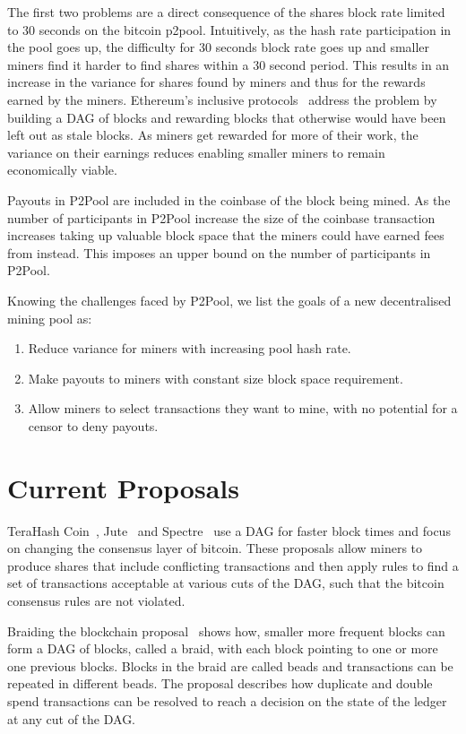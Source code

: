 \documentclass{article}
\begin{document}
The first two problems are a direct consequence of the shares block
rate limited to 30 seconds on the bitcoin p2pool. Intuitively, as the
hash rate participation in the pool goes up, the difficulty for 30
seconds block rate goes up and smaller miners find it harder to find
shares within a 30 second period. This results in an increase in the
variance for shares found by miners and thus for the rewards earned by
the miners. Ethereum's inclusive protocols~\cite{inclusive-protocols}
address the problem by building a DAG of blocks and rewarding blocks
that otherwise would have been left out as stale blocks. As miners get
rewarded for more of their work, the variance on their earnings
reduces enabling smaller miners to remain economically viable.

Payouts in P2Pool are included in the coinbase of the block being
mined. As the number of participants in P2Pool increase the size of
the coinbase transaction increases taking up valuable block space that
the miners could have earned fees from instead. This imposes an upper
bound on the number of participants in P2Pool.

Knowing the challenges faced by P2Pool, we list the goals of a new
decentralised mining pool as:

\begin{enumerate}
\item Reduce variance for miners with increasing pool hash rate.
\item Make payouts to miners with constant size block space
  requirement.
\item Allow miners to select transactions they want to mine, with no
  potential for a censor to deny payouts.
\end{enumerate}

\section{Current Proposals}

TeraHash Coin~\cite{mcelrath:variance}, Jute~\cite{jute} and
Spectre~\cite{spectre} use a DAG for faster block times and focus on
changing the consensus layer of bitcoin. These proposals allow miners
to produce shares that include conflicting transactions and then apply
rules to find a set of transactions acceptable at various cuts of the
DAG, such that the bitcoin consensus rules are not violated.

Braiding the blockchain proposal~\cite{mcelrath:variance} shows how,
smaller more frequent blocks can form a DAG of blocks, called a braid,
with each block pointing to one or more one previous blocks. Blocks in
the braid are called beads and transactions can be repeated in
different beads. The proposal describes how duplicate and double spend
transactions can be resolved to reach a decision on the state of the
ledger at any cut of the DAG.\@
\end{document}
